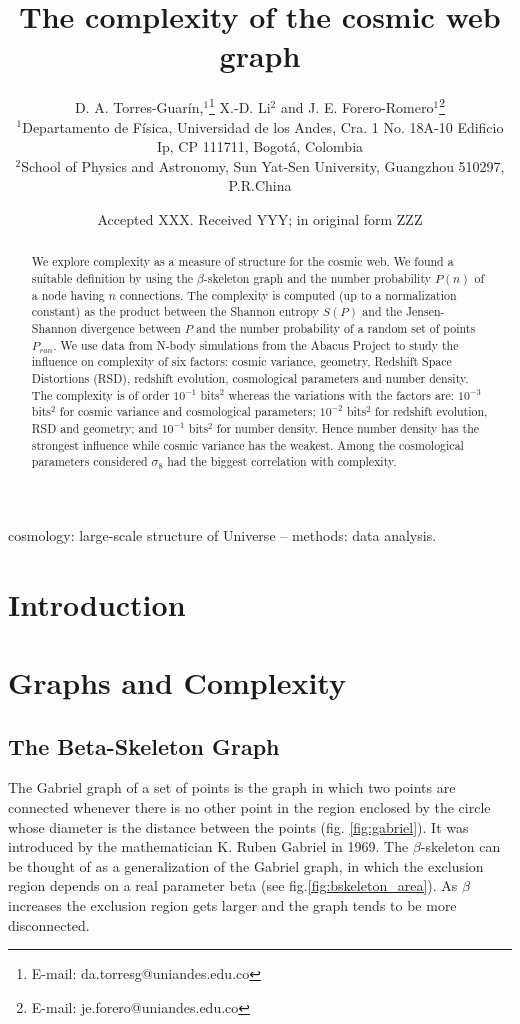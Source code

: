 \documentclass[fleqn,usenatbib]{mnras}
\title[Cosmic Web Graph Complexity]{The complexity of the cosmic web graph}
\author[Torres-Guar\'in et al.]{
D. A. Torres-Guar\'in,$^{1}$\thanks{E-mail: da.torresg@uniandes.edu.co}
X.-D. Li$^{2}$
and J. E. Forero-Romero$^{1}$\thanks{E-mail: je.forero@uniandes.edu.co}
\\
$^{1}$Departamento de F\'isica, Universidad de los Andes, Cra. 1 No. 18A-10 Edificio Ip, CP 111711, Bogot\'a, Colombia\\
$^{2}$School of Physics and Astronomy, Sun Yat-Sen University, Guangzhou 510297, P.R.China\\
}
\date{Accepted XXX. Received YYY; in original form ZZZ}
\begin{document}
\label{firstpage}
\pagerange{\pageref{firstpage}--\pageref{lastpage}}
\maketitle

\begin{abstract}
We explore complexity as a measure of structure for the cosmic web. We found a suitable definition by using the $\beta$-skeleton graph and the number probability $P(n)$ of a node having $n$ connections. The complexity is computed (up to a normalization constant) as the product between the Shannon entropy $S(P)$ and the Jensen-Shannon divergence between $P$ and the number probability of a random set of points $P_{ran}$. We use data from N-body simulations from the Abacus Project to study the influence on complexity of six factors: cosmic variance, geometry, Redshift Space Distortions (RSD), redshift evolution, cosmological parameters and number density. The complexity is of order $10^{-1}$ bits$^2$ whereas the variations with the factors are: $10^{-3}$ bits$^2$ for cosmic variance and cosmological parameters; $10^{-2}$ bits$^2$ for redshift evolution, RSD and geometry; and $10^{-1}$ bits$^2$ for number density. Hence number density has the strongest influence while cosmic variance has the weakest. Among the cosmological parameters considered $\sigma_{8}$ had the biggest correlation with complexity.
   \end{abstract}
\begin{keywords}
cosmology: large-scale structure of Universe -- methods: data analysis.
\end{keywords}


\section{Introduction}

\section{Graphs and Complexity}

\subsection{The Beta-Skeleton Graph}

The Gabriel graph of a set of points is the graph in which two points are connected whenever there is no other point in the region enclosed by the circle whose diameter is the distance between the points (fig. \ref{fig:gabriel}).  
It was introduced by the mathematician K. Ruben Gabriel in 1969.
The $\beta$-skeleton can be thought of as a generalization of the Gabriel graph, in which the exclusion region depends on a real parameter beta (see fig.\ref{fig:bskeleton_area}).  
As $\beta$ increases the exclusion
region gets larger and the graph tends to be
more disconnected. 
\end{document}
